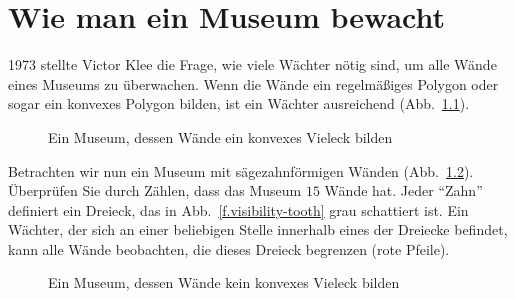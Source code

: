 
\chapter{Wie man ein Museum bewacht}\label{c.museum}


1973 stellte Victor Klee die Frage, wie viele Wächter nötig sind, um alle Wände eines Museums zu überwachen. Wenn die Wände ein regelmäßiges Polygon oder sogar ein konvexes Polygon bilden, ist ein Wächter ausreichend (Abb.~\ref{f.museum.convex}).

\begin{figure}[ht]
\begin{center}
\end{center}
\caption{Ein Museum, dessen Wände ein konvexes Vieleck bilden}\label{f.museum.convex}
\end{figure}

Betrachten wir nun ein Museum mit sägezahnförmigen Wänden (Abb.~\ref{f.museum.nonconvex}). Überprüfen Sie durch Zählen, dass das Museum $15$ Wände hat. Jeder ``Zahn'' definiert ein Dreieck, das in Abb.~\ref{f.visibility-tooth} grau schattiert ist. Ein Wächter, der sich an einer beliebigen Stelle innerhalb eines der Dreiecke befindet, kann alle Wände beobachten, die dieses Dreieck begrenzen (rote Pfeile).
\begin{figure}[b]
\begin{center}
\end{center}
\caption{Ein Museum, dessen Wände kein konvexes Vieleck bilden}\label{f.museum.nonconvex}
\end{figure}

